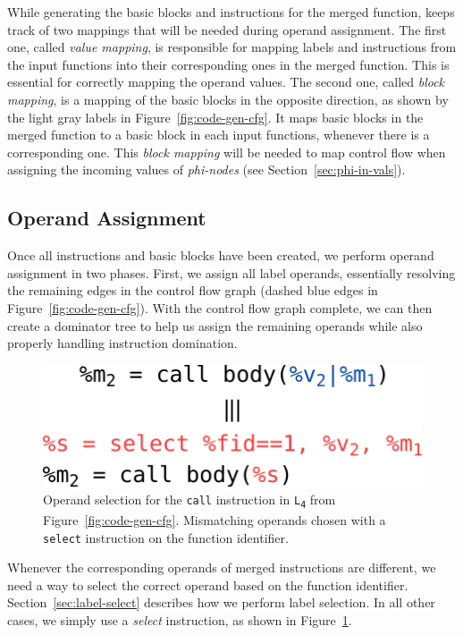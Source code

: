 While generating the basic blocks and instructions for the merged function,
{\ProjName} keeps track of two mappings that will be needed during operand assignment.
The first one, called \textit{value mapping}, is responsible for mapping labels
and instructions from the input functions into their corresponding ones in the merged
function.
This is essential for correctly mapping the operand values.
The second one, called \textit{block mapping}, is a mapping of the basic blocks
in the opposite direction, as shown by the light gray labels in Figure~\ref{fig:code-gen-cfg}.
It maps basic blocks in the merged function to a basic block in each input functions,
whenever there is a corresponding one.
This \textit{block mapping} will be needed to map control flow when assigning the
incoming values of \textit{phi-nodes} (see Section~\ref{sec:phi-in-vals}).

\subsection{Operand Assignment} \label{sec:op-assign}

Once all instructions and basic blocks have been created, we perform operand
assignment in two phases.
First, we assign all label operands, essentially resolving the remaining edges
in the control flow graph (dashed blue edges in Figure~\ref{fig:code-gen-cfg}).
With the control flow graph complete, we can then create a dominator
tree to help us assign the remaining operands while also properly
handling instruction domination.

\begin{figure}[t]
  \centering
  \includegraphics[scale=0.7]{src/merge-operation/figs/operand-select.pdf}
  \caption{Operand selection for the \texttt{call} instruction in \texttt{L\textsubscript{4}}
             from Figure~\ref{fig:code-gen-cfg}. Mismatching operands chosen
             with a \texttt{select} instruction on the function identifier.}
  \label{fig:operand-select}
\end{figure}

Whenever the corresponding operands of merged instructions are different, we
need a way to select the correct operand based on the function identifier.
Section~\ref{sec:label-select} describes how we perform label selection.
In all other cases, we simply use a \textit{select} instruction, as shown in
Figure~\ref{fig:operand-select}.

